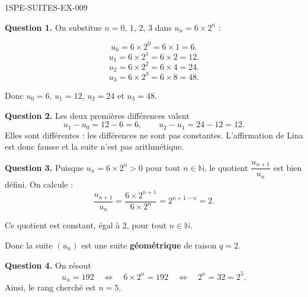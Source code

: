 \begin{corrige}{1SPE-SUITES-EX-009}


\textbf{Question 1.} On substitue $n = 0$, $1$, $2$, $3$ dans $u_n = 6 \times 2^n$ :

\[
u_0 = 6 \times 2^0 = 6 \times 1 = 6.
\]
\[
u_1 = 6 \times 2^1 = 6 \times 2 = 12.
\]
\[
u_2 = 6 \times 2^2 = 6 \times 4 = 24.
\]
\[
u_3 = 6 \times 2^3 = 6 \times 8 = 48.
\]

Donc $u_0 = 6$, $u_1 = 12$, $u_2 = 24$ et $u_3 = 48$.


\textbf{Question 2.} Les deux premières différences valent
\[
u_1-u_0=12-6=6,
\qquad
u_2-u_1=24-12=12.
\]
Elles sont différentes : les différences ne sont pas constantes. L'affirmation
de Lina est donc fausse et la suite n'est pas arithmétique.


\textbf{Question 3.} Puisque $u_n = 6 \times 2^n > 0$ pour tout $n \in \mathbb{N}$, le quotient $\dfrac{u_{n+1}}{u_n}$ est bien défini. On calcule :
\[
\frac{u_{n+1}}{u_n} = \frac{6 \times 2^{n+1}}{6 \times 2^n} = 2^{n+1-n} = 2.
\]

Ce quotient est constant, égal à $2$, pour tout $n \in \mathbb{N}$.

Donc la suite $(u_n)$ est une suite \textbf{géométrique} de raison $q = 2$.


\textbf{Question 4.} On résout
\[
u_n=192
\quad\Longleftrightarrow\quad
6\times 2^n=192
\quad\Longleftrightarrow\quad
2^n=32=2^5.
\]
Ainsi, le rang cherché est $n=5$.

\end{corrige}

